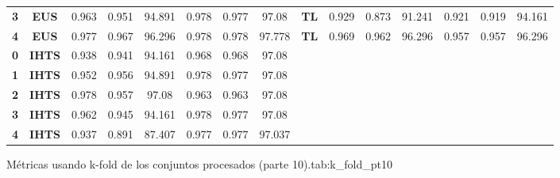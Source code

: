 {{\begin{tabular}{c|c|cccccc|ccccccc}
\textbf{3} & \textbf{EUS} & 0.963 & 0.951 & 94.891 & 0.978 & 0.977 & 97.08 & \multicolumn{1}{c|}{\textbf{TL}} & 0.929 & 0.873 & 91.241 & 0.921 & 0.919 & 94.161 \\
\textbf{4} & \textbf{EUS} & 0.977 & 0.967 & 96.296 & 0.978 & 0.978 & 97.778 & \multicolumn{1}{c|}{\textbf{TL}} & 0.969 & 0.962 & 96.296 & 0.957 & 0.957 & 96.296 \\
\textbf{0} & \textbf{IHTS} & 0.938 & 0.941 & 94.161 & 0.968 & 0.968 & 97.08 &       &       &       &       &       &       &  \\
\textbf{1} & \textbf{IHTS} & 0.952 & 0.956 & 94.891 & 0.978 & 0.977 & 97.08 &       &       &       &       &       &       &  \\
\textbf{2} & \textbf{IHTS} & 0.978 & 0.957 & 97.08 & 0.963 & 0.963 & 97.08 &       &       &       &       &       &       &  \\
\textbf{3} & \textbf{IHTS} & 0.962 & 0.945 & 94.161 & 0.978 & 0.977 & 97.08 &       &       &       &       &       &       &  \\
\textbf{4} & \textbf{IHTS} & 0.937 & 0.891 & 87.407 & 0.977 & 0.977 & 97.037 &       &       &       &       &       &       &  \\
\end{tabular}}}{Métricas usando k-fold de los conjuntos procesados (parte 10).}{tab:k_fold_pt10}

